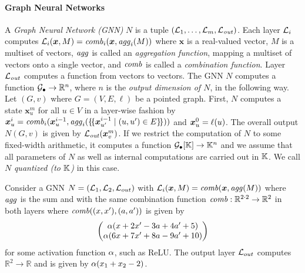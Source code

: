 \paragraph{Graph Neural Networks} 
A \emph{Graph Neural Network (GNN)} $N$ is a tuple $(\mathcal{L}_1, \dotsc, \mathcal{L}_m, \mathcal{L}_{\mathit{out}})$. Each layer $\mathcal{L}_i$ computes 
$\mathcal{L}_i(\boldsymbol{x}, M) = \mathit{comb}_i(\boldsymbol{x}, \mathit{agg}_i(M))$ where $\boldsymbol{x}$ is a real-valued vector, $M$ is a 
multiset of vectors, $\mathit{agg}$ is called an \emph{aggregation function}, mapping a multiset of vectors onto a single vector, 
and $\mathit{comb}$ is called a \emph{combination function}. Layer $\mathcal{L}_{\mathit{out}}$ computes a function from vectors to vectors.
The GNN $N$ computes a function $\mathcal{G}_\bullet \rightarrow \mathbb{R}^n$, where $n$ is the \emph{output dimension
of $N$}, in the following way. Let $(G, v)$ where $G=(V,E,\ell)$ be a pointed graph. 
First, $N$ computes a state $\boldsymbol{x}^m_u$
for all $u \in V$ in a layer-wise fashion by $\boldsymbol{x}^i_u = \mathit{comb}_i(\boldsymbol{x}^{i-1}_u, \mathit{agg}_i(\{\!\{\boldsymbol{x}^{i-1}_{u'} \mid (u,u') \in E\}\!\}))$ 
and $\boldsymbol{x}^0_u = \ell(u)$. The overall output $N(G,v)$ is given by $\mathcal{L}_{\mathit{out}}(\boldsymbol{x}^m_{v})$.
If we restrict the computation of $N$ to some fixed-width arithmetic, it computes a function 
$\mathcal{G}_\bullet[\mathbb K] \rightarrow \mathbb K^n$ and we assume that all parameters of $N$ as well as internal
computations are carried out in $\mathbb K$. We call $N$ \emph{quantized (to $\mathbb K$)} in this case.


\begin{example}\label{ex:basic}
    Consider a GNN $N = (\mathcal{L}_1, \mathcal{L}_2, \mathcal{L}_{out})$ with $\mathcal{L}_i(\boldsymbol{x}, M) = \mathit{comb}(\boldsymbol{x}, \mathit{agg}(M))$
    where $\mathit{agg}$ is the sum and with the same combination function $\mathit{comb}: \mathbb{R}^{2\cdot2} \rightarrow \mathbb{R}^2$ in both layers where
    $\mathit{comb}((x, x'),(a, a'))$ is given
    by
    \begin{displaymath}
    \left(\begin{matrix}
		\alpha(x + 2x' - 3a + 4a' + 5) \\
		\alpha(6x + 7x' + 8a - 9a' + 10) \\
	\end{matrix}\right)
 \end{displaymath}
 for some activation function $\alpha$, such as ReLU. The output layer $\mathcal{L}_{out}$ 
 computes $\mathbb{R}^2 \rightarrow \mathbb{R}$ and is
 given by $\alpha(x_1 + x_2 - 2)$.
\end{example}



